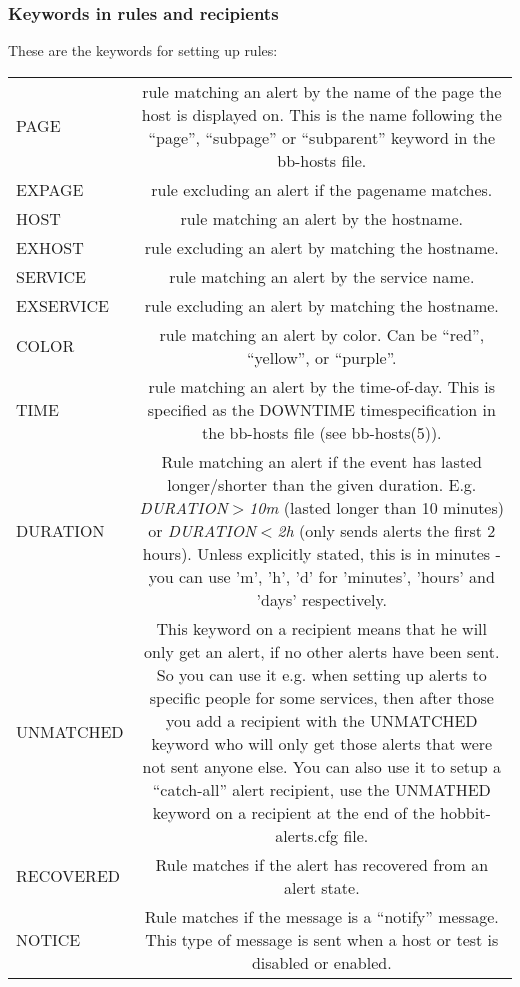 \subsubsection*{Keywords in rules and recipients}


 These are the keywords for setting up rules:


\begin{tabular}{lc}
PAGE &rule matching an alert by the name of the page the host is displayed on. This is the name following the ``page'', ``subpage'' or ``subparent'' keyword in the bb-hosts file. \\
EXPAGE &rule excluding an alert if the pagename matches. \\
HOST &rule matching an alert by the hostname. \\
EXHOST &rule excluding an alert by matching the hostname. \\
SERVICE &rule matching an alert by the service name. \\
EXSERVICE &rule excluding an alert by matching the hostname. \\
COLOR &rule matching an alert by color. Can be ``red'', ``yellow'', or ``purple''. \\
TIME &rule matching an alert by the time-of-day. This is specified as the DOWNTIME timespecification in the bb-hosts file (see bb-hosts(5)). \\
DURATION &Rule matching an alert if the event has lasted longer/shorter than the given duration. E.g. \emph{DURATION$>$10m}
 (lasted longer than 10 minutes) or \emph{DURATION$<$2h}
 (only sends alerts the first 2 hours). Unless explicitly stated, this is in minutes - you can use 'm', 'h', 'd' for 'minutes', 'hours' and 'days' respectively. \\
UNMATCHED &This keyword on a recipient means that he will only get an alert, if no other alerts have been sent. So you can use it e.g. when setting up alerts to specific people for some services, then after those you add a recipient with the UNMATCHED keyword who will only get those alerts that were not sent anyone else. You can also use it to setup a ``catch-all'' alert recipient, use the UNMATHED keyword on a recipient at the end of the hobbit-alerts.cfg file. \\
RECOVERED &Rule matches if the alert has recovered from an alert state. \\
NOTICE &Rule matches if the message is a ``notify'' message. This type of message is sent when a host or test is disabled or enabled.

\end{tabular}



